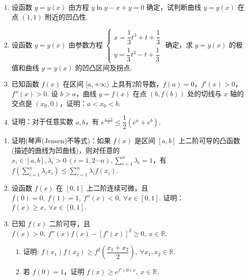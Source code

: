 \begin{enumerate}[label=\textbf{\arabic*.}, itemsep=6cm, resume]
    \item 设函数 $y=y(x)$ 由方程 $y\ln y-x+y=0$ 确定，试判断曲线 $y=y(x)$ 在点 $(1,1)$ 附近的凹凸性.
    
    \item 设函数 $y=y(x)$ 由参数方程
    $ \begin{cases} x=\dfrac{1}{3}t^3+t+\dfrac{1}{3} \\ y=\dfrac{1}{3}t^3-t+\dfrac{1}{3} \end{cases} $
    确定，求 $y=y(x)$ 的极值和曲线 $y=y(x)$ 的凹凸区间及拐点.
    
    \item 已知函数 $f(x)$ 在区间 $[a,+\infty)$ 上具有2阶导数，$f(a)=0$，$f'(x)>0$，$f''(x)>0$. 设 $b>a$，曲线 $y=f(x)$ 在点 $(b,f(b))$ 处的切线与 $x$ 轴的交点是 $(x_0,0)$，证明：$a<x_0<b$.
    
    \item 证明：对于任意实数 $a,b$，有
    $ e^{\frac{a+b}{2}}\le\dfrac{1}{2}(e^a+e^b). $
\end{enumerate}

\newpage

\begin{enumerate}[label=\textbf{\arabic*.}, itemsep=6cm, resume]
    \item 证明(琴声(Jensen)不等式)：如果 $f(x)$ 是区间 $[a,b]$ 上二阶可导的凸函数(描述的曲线为凹曲线)，则对任意的 $x_i\in[a,b],\lambda_i>0\ (i=1,2\cdots n),\sum\limits_{i=1}^n\lambda_i=1$，有
    $ f\left(\sum_{i=1}^n\lambda_i x_i\right)\le\sum_{i=1}^n\lambda_i f(x_i). $
    
    \item 设函数 $f(x)$ 在 $[0,1]$ 上二阶连续可微，且
    $ f(0)=0,\ f(1)=1,\ f''(x)<0,\ \forall x\in[0,1]. $
    证明：$f(x)\ge x,\ \forall x\in[0,1]$.
    
    \item 已知 $f(x)$ 二阶可导，且
    $ f(x)>0,\ f''(x)f(x)-[f'(x)]^2\ge0,\ x\in\mathbb{R}. $
    \begin{enumerate}[label=(\arabic*)]
        \item 证明: $f(x_1)f(x_2)\ge f^2\left(\dfrac{x_1+x_2}{2}\right),\ \forall x_1,x_2\in\mathbb{R}$.
        \item 若 $f(0)=1$，证明 $f(x)\ge e^{f'(0)x},\ x\in\mathbb{R}$.
    \end{enumerate}
\end{enumerate}